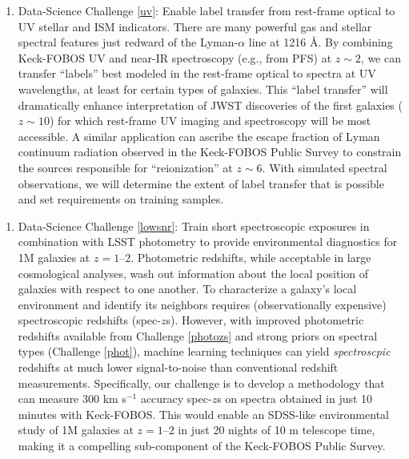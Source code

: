 \documentclass[oneside,11pt]{amsart}
\newcounter{chalno}
\newcommand{\chal}[1]{\refstepcounter{chalno}\label{#1}}
\begin{document}

\begin{enumerate}[rightmargin=0.2cm,leftmargin=0.2cm]
%
\chal{uv}
%
\item[] {\textsf {\large Data-Science Challenge \ref{uv}: Enable label transfer
from rest-frame optical to UV stellar and ISM indicators}}.  There are
many powerful gas and stellar spectral features just redward of the
Lyman-$\alpha$ line at 1216 \AA.  By combining Keck-FOBOS UV and near-IR
spectroscopy (e.g., from PFS) at $z \sim 2$, we can transfer ``labels''
best modeled in the rest-frame optical to spectra at UV wavelengths, at
least for certain types of galaxies.  This ``label transfer'' will
dramatically enhance interpretation of JWST discoveries of the first
galaxies ($z \sim 10$) for which rest-frame UV imaging and spectroscopy
will be most accessible.  A similar application can ascribe the escape
fraction of Lyman continuum radiation observed in the Keck-FOBOS Public
Survey to constrain the sources responsible for ``reionization'' at $z
\sim 6$.  With simulated spectral observations, we will determine the
extent of label transfer that is possible and set requirements on
training samples.

\end{enumerate}

%

\begin{enumerate}[rightmargin=0.2cm,leftmargin=0.2cm]
\chal{lowsnr}
%
\item[] {\textsf {\large Data-Science Challenge \ref{lowsnr}: Train short
spectroscopic exposures in combination with LSST photometry to provide
environmental diagnostics for 1M galaxies at $z=1$--$2$}}.  Photometric
redshifts, while acceptable in large cosmological analyses, wash out
information about the local position of galaxies with respect to one
another.  To characterize a galaxy's local environment and identify its
neighbors requires (observationally expensive) spectroscopic redshifts
(spec-$z$s).  However, with improved photometric redshifts available
from Challenge \ref{photozs} and strong priors on spectral types
(Challenge \ref{phot}), machine learning techniques can yield
\emph{spectroscpic} redshifts at much lower signal-to-noise than
conventional redshift measurements. Specifically, our challenge is to
develop a methodology that can measure 300 km s$^{-1}$ accuracy
spec-$z$s on spectra obtained in just 10 minutes with Keck-FOBOS.  This
would enable an SDSS-like environmental study of 1M galaxies at
$z=1$--$2$ in just 20 nights of 10 m telescope time, making it a
compelling sub-component of the Keck-FOBOS Public Survey.

\end{enumerate}
\end{document}
